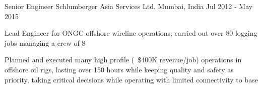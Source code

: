 \begin{cventries}
  \cventry
	{Senior Engineer} %
	{Schlumberger Asia Services Ltd.} %
	{Mumbai, India} %
	{Jul 2012 - May 2015} %
	{
		\begin{cvitems} %
			\item{Lead Engineer for ONGC offshore wireline operations; carried out over 80 logging jobs managing a crew of 8}
			\item {Planned and executed many high profile (~\$400K revenue/job) operations in offshore oil rigs, lasting over 150 hours while keeping quality and safety as priority, taking critical decisions while operating with limited connectivity to base}
		\end{cvitems}
	}
\vspace{-4mm}

\end{cventries}
